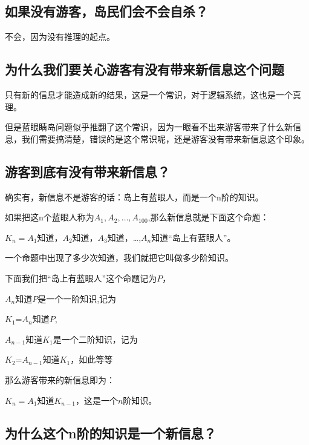 \documentclass[lang=cn,11pt,a4paper]{elegantpaper}
\begin{document}
\subsection{如果没有游客，岛民们会不会自杀？}

不会，因为没有推理的起点。 

\subsection{为什么我们要关心游客有没有带来新信息这个问题}

只有新的信息才能造成新的结果，这是一个常识，对于逻辑系统，这也是一个真理。

但是蓝眼睛岛问题似乎推翻了这个常识，因为一眼看不出来游客带来了什么新信息，我们需要搞清楚，错误的是这个常识呢，还是游客没有带来新信息这个印象。

\subsection{游客到底有没有带来新信息？}

确实有，新信息不是游客的话：岛上有蓝眼人，而是一个n阶的知识。

如果把这n个蓝眼人称为$A_1,A_2,\ldots,A_100$,那么新信息就是下面这个命题：

$K_n=A_1$知道，$A_2$知道，$A_3$知道，\ldots,$A_n$知道“岛上有蓝眼人”。

一个命题中出现了多少次知道，我们就把它叫做多少阶知识。

下面我们把“岛上有蓝眼人”这个命题记为$P$，

$A_n$知道$P$是一个一阶知识,记为

$K_1$=$A_n$知道$P$,

$A_{n-1}$知道$K_1$是一个二阶知识，记为

$K_2$=$A_{n-1}$知道$K_1$，如此等等

那么游客带来的新信息即为：

$K_n=A_1$知道$K_{n-1}$，这是一个$n$阶知识。

\subsection{为什么这个n阶的知识是一个新信息？}
\end{document}
